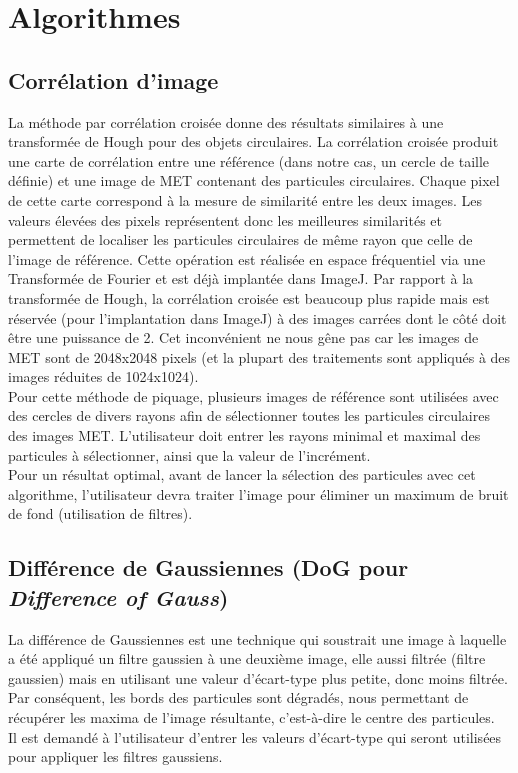 \section{Algorithmes}

\subsection{Corrélation d'image}

La méthode par corrélation croisée donne des résultats similaires à une transformée de Hough pour des objets circulaires. La corrélation croisée produit une carte de corrélation entre une référence (dans notre cas, un cercle de taille définie) et une image de MET contenant des particules circulaires. Chaque pixel de cette carte correspond à la mesure de similarité entre les deux images. Les valeurs élevées des pixels représentent donc les meilleures similarités et permettent de localiser les particules circulaires de même rayon que celle de l'image de référence. Cette opération est réalisée en espace fréquentiel via une Transformée de Fourier et est déjà implantée dans ImageJ. Par rapport à la transformée de Hough, la corrélation croisée est beaucoup plus rapide mais est réservée (pour l'implantation dans ImageJ) à des images carrées dont le côté doit être une puissance de 2. Cet inconvénient ne nous gêne pas car les images de MET sont de 2048x2048 pixels (et la plupart des traitements sont appliqués à des images réduites de 1024x1024). \\

\noindent
Pour cette méthode de piquage, plusieurs images de référence sont utilisées avec des cercles de divers rayons afin de sélectionner toutes les particules circulaires des images MET. L'utilisateur doit entrer les rayons minimal et maximal des particules à sélectionner, ainsi que la valeur de l'incrément. \\
Pour un résultat optimal, avant de lancer la sélection des particules avec cet algorithme, l'utilisateur devra traiter l'image pour éliminer un maximum de bruit de fond (utilisation de filtres).

\subsection{Différence de Gaussiennes (DoG pour \textit{Difference of Gauss})}

La différence de Gaussiennes est une technique qui soustrait une image à laquelle a été appliqué un filtre gaussien à une deuxième image, elle aussi filtrée (filtre gaussien) mais en utilisant une valeur d'écart-type plus petite, donc moins filtrée. Par conséquent, les bords des particules sont dégradés, nous permettant de récupérer les maxima de l'image résultante, c'est-à-dire le centre des particules.\\
\noindent
Il est demandé à l'utilisateur d'entrer les valeurs d'écart-type qui seront utilisées pour appliquer les filtres gaussiens.

